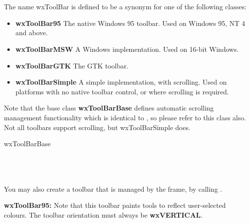 \section{}\label{wxtoolbar}

The name wxToolBar is defined to be a synonym for one of the following classes:

\begin{itemize}\itemsep=0pt
\item {\bf wxToolBar95} The native Windows 95 toolbar. Used on Windows 95, NT 4 and above.
\item {\bf wxToolBarMSW} A Windows implementation. Used on 16-bit Windows.
\item {\bf wxToolBarGTK} The GTK toolbar.
\item {\bf wxToolBarSimple} A simple implementation, with scrolling.
Used on platforms with no native toolbar control, or where scrolling is required.
\end{itemize}

Note that the base class {\bf wxToolBarBase} defines
automatic scrolling management functionality which is identical
to , so please refer to this class also.
Not all toolbars support scrolling, but wxToolBarSimple does.


wxToolBarBase\\
\\
\\
\\


You may also create a toolbar that is managed by the frame, by
calling .

{\bf wxToolBar95:} Note that this toolbar paints tools to reflect user-selected colours.
The toolbar orientation must always be {\bf wxVERTICAL}.


\twocolwidtha{5cm}
\begin{twocollist}\itemsep=0pt
\end{twocollist}


